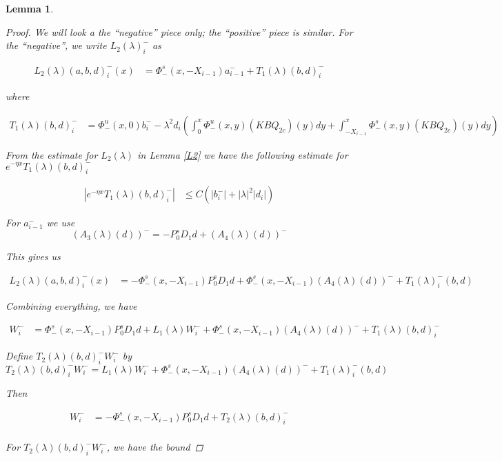 \documentclass[12pt]{article}
\newtheorem{lemma}{Lemma}
\begin{document}
\begin{lemma}
\begin{proof}
We will look a the ``negative'' piece only; the ``positive'' piece is similar. For the ``negative'', we write $L_2(\lambda)_i^-$ as 

\begin{align*}
L_2(\lambda)(a, b, d)_i^-(x) &= \Phi^s_-(x, -X_{i-1})a^-_{i-1} + T_1(\lambda)(b,d)_i^-
\end{align*}

where

\begin{align*}
T_1(\lambda)(b,d)_i^- &= \Phi^u_-(x, 0)b_i^- - \lambda^2 d_i \left( \int_0^x \Phi^u_-(x, y)(KBQ_{2c})(y) dy  + \int_{-X_{i-1}}^x \Phi^s_-(x, y)(KBQ_{2c})(y) dy \right)
\end{align*}


From the estimate for $L_2(\lambda)$ in Lemma \ref{L2} we have the following estimate for $ e^{-\eta x} T_1(\lambda)(b,d)_i^-$

\begin{align*}
| e^{-\eta x} T_1(\lambda)(b,d)_i^-| &\leq C \left( |b_i^-| + |\lambda|^2 |d_i| \right)
\end{align*}

For $a^-_{i-1}$ we use
\[
(A_3(\lambda)(d))^- = -P_0^s D_1 d + (A_4(\lambda)(d))^-
\]

This gives us

\begin{align*}
L_2(\lambda)(a, b, d)_i^-(x) &= -\Phi^s_-(x, -X_{i-1}) P_0^s D_1 d + \Phi^s_-(x, -X_{i-1}) (A_4(\lambda)(d))^- + T_1(\lambda)_i^-(b,d)
\end{align*}

Combining everything, we have

\begin{align*}
W_i^- &= \Phi^s_-(x, -X_{i-1}) P_0^s D_1 d + L_1(\lambda)W_i^- + \Phi^s_-(x, -X_{i-1}) (A_4(\lambda)(d))^- + T_1(\lambda)(b,d)_i^-
\end{align*}

Define $T_2(\lambda)(b,d)_i^- W_i^-$ by 
\[
T_2(\lambda)(b,d)_i^- W_i^- = L_1(\lambda) W_i^- + \Phi^s_-(x, -X_{i-1}) (A_4(\lambda)(d))^- + T_1(\lambda)_i^-(b,d)
\]

Then

\begin{align*}
W_i^- &= -\Phi^s_-(x, -X_{i-1}) P_0^s D_1 d + T_2(\lambda)(b,d)_i^-\\
\end{align*}

For $T_2(\lambda)(b,d)_i^- W_i^-$, we have the bound


\end{proof}
\end{lemma}
\end{document}
